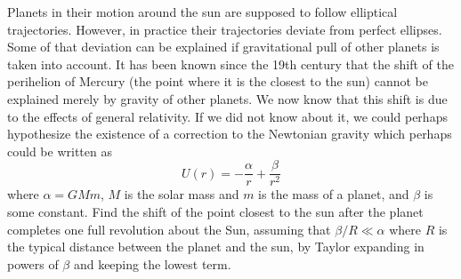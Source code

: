 \documentclass[12pt]{article}
\begin{document}
\begin{problem}{2}
    Planets in their motion around the sun are supposed to follow elliptical
    trajectories. However, in practice their trajectories deviate from perfect
    ellipses. Some of that deviation can be explained if gravitational pull of
    other planets is taken into account. It has been known since the 19th
    century that the shift of the perihelion of Mercury (the point where it is
    the closest to the sun) cannot be explained merely by gravity of other
    planets. We now know that this shift is due to the effects of general
    relativity. If we did not know about it, we could perhaps hypothesize the
    existence of a correction to the Newtonian gravity which perhaps could be
    written as
    \begin{equation}
        U(r)=-\frac{\alpha}{r}+\frac\beta{r^2} 
    \end{equation}
    where $\alpha=GMm$, $M$ is the solar mass and $m$ is the mass of a planet,
    and $\beta$ is some constant. Find the shift of the point closest to the sun
    after the planet completes one full revolution about the Sun, assuming that
    $\beta/R\ll\alpha$ where $R$ is the typical distance between the planet and
    the sun, by Taylor expanding in powers of $\beta$ and keeping the lowest
    term.
    

\end{problem}
\end{document}
